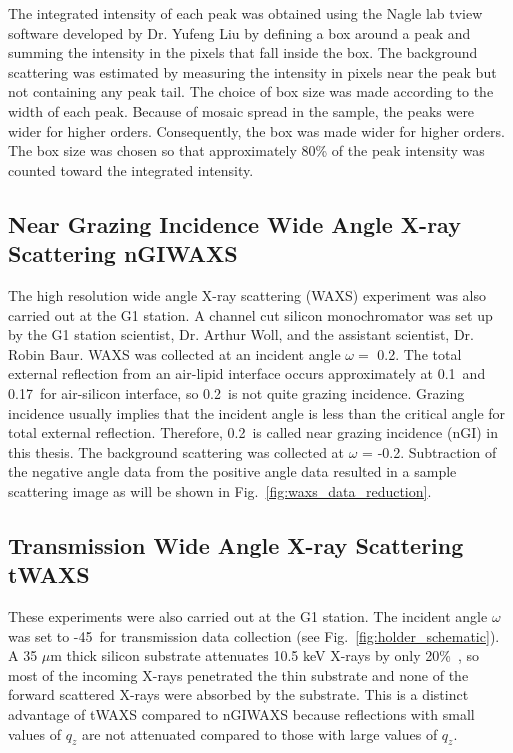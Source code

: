 The integrated intensity of each peak was obtained using the Nagle lab tview
software developed by Dr. Yufeng Liu \cite{Liu03} by defining a box around a
peak and summing the intensity in the pixels that fall inside the box.
The background scattering was estimated by measuring the intensity in pixels
near the peak but not containing any peak tail. The choice of box size was 
made according to the width of each peak. Because of mosaic spread in the sample,
the peaks were wider for higher orders. 
Consequently, the box was made wider for higher
orders. The box size was chosen so that approximately 80\% of the peak intensity
was counted toward the integrated intensity.

\subsection{Near Grazing Incidence Wide Angle X-ray Scattering nGIWAXS}\label{sec:nGIWAXS_method}
The high resolution wide angle X-ray scattering (WAXS)
experiment was also carried out at the G1 station. 
A channel cut silicon monochromator was set up by the G1
station scientist, Dr. Arthur Woll, and the assistant scientist, Dr. Robin Baur.
WAXS was collected at an incident angle $\omega=$ 
0.2\textdegree. 
The total external reflection from an air-lipid interface occurs approximately 
at 0.1\textdegree\ and 0.17\textdegree\ for air-silicon interface, 
so 0.2\textdegree\ is not quite grazing incidence.
Grazing incidence usually implies that the incident angle is less than the 
critical angle for total external reflection.
Therefore, 0.2\textdegree\ is called near grazing incidence (nGI) in this thesis.
The background scattering was collected at $\omega$ = -0.2\textdegree. Subtraction
of the negative angle data from the positive angle data resulted in 
a sample scattering image as will be shown in 
Fig.~\ref{fig:waxs_data_reduction}.


\subsection{Transmission Wide Angle X-ray Scattering tWAXS}\label{sec:tWAXS_method}
These experiments were also carried out at the G1 station.
The incident angle $\omega$ was set to -45\textdegree\ for transmission data
collection (see Fig.~\ref{fig:holder_schematic}). 
A 35 $\mu$m thick silicon substrate attenuates 10.5 keV X-rays 
by only 20\%\ \cite{ref:cxro}, so most of the incoming X-rays penetrated
the thin substrate and none of the forward scattered X-rays were absorbed by the 
substrate.  This is a distinct advantage of tWAXS compared to nGIWAXS because 
reflections with small values of $q_z$ are not attenuated compared to those 
with large values of $q_z$.
 
